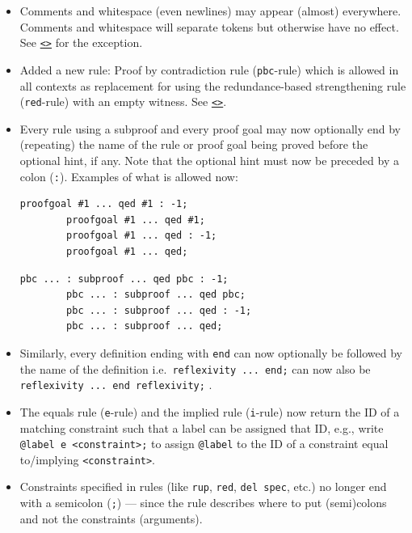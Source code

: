 \documentclass[a4paper]{article}
\newcommand{\lnkBNF}[1]{\hyperlink{def:#1}{<\detokenize{#1}>}}
\begin{document}
\begin{itemize}
	\item Comments and whitespace (even newlines) may appear (almost) everywhere. Comments and whitespace will separate tokens but otherwise have no effect. See \texttt{\lnkBNF{header}} for the exception.
	\item Added a new rule: Proof by contradiction rule (\verb!pbc!-rule) which is allowed in all contexts as replacement for using the redundance-based strengthening rule (\verb!red!-rule) with an empty witness. See \texttt{\lnkBNF{pbc_rule}}.
	\item Every rule using a subproof and every proof goal may now optionally end by (repeating) the name of the rule or proof goal being proved before the optional hint, if any. Note that the optional hint must now be preceded by a colon (\verb!:!). Examples of what is allowed now:
	      \\[1mm]
	      \begin{minipage}{.49\linewidth}
		      \begin{lstlisting}[language=veripb, gobble=8]
		proofgoal #1 ... qed #1 : -1;
		proofgoal #1 ... qed #1;
		proofgoal #1 ... qed : -1;
		proofgoal #1 ... qed;
		\end{lstlisting}
	      \end{minipage}\hfill%
	      \begin{minipage}{.49\linewidth}
		      \begin{lstlisting}[language=veripb, gobble=8]
		pbc ... : subproof ... qed pbc : -1;
		pbc ... : subproof ... qed pbc;
		pbc ... : subproof ... qed : -1;
		pbc ... : subproof ... qed;
		\end{lstlisting}
	      \end{minipage}
	\item Similarly, every definition ending with \verb!end! can now optionally be followed by the name of the definition i.e.\ \lstinline[language=veripb]!reflexivity ... end;! can now also be \lstinline[language=veripb]!reflexivity ... end reflexivity;! .
	\item The equals rule (\verb!e!-rule) and the implied rule (\verb!i!-rule) now return the ID of a matching constraint such that a label can be assigned that ID, e.g., write \lstinline[language=veripb]!@label e !\verb!<constraint>;! to assign \lstinline[language=veripb]!@label! to the ID of a constraint equal to/implying \verb!<constraint>!.
	\item Constraints specified in rules (like \verb!rup!, \verb!red!, \verb!del spec!, etc.) no longer end with a semicolon (\verb!;!) --- since the rule describes where to put (semi)colons and not the constraints (arguments).

\end{itemize}
\end{document}

